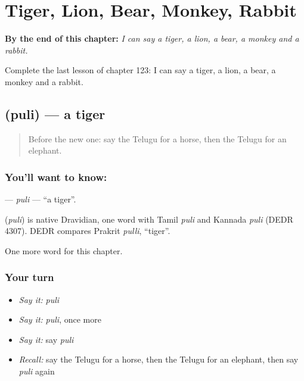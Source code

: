 
\chapter{Tiger, Lion, Bear, Monkey, Rabbit}
\label{ch:te-tiger-lion-bear-monkey-rabbit}

\begin{chapteropening}
\textbf{By the end of this chapter:} \emph{I can say a tiger, a lion, a bear, a monkey and a rabbit.}

Complete the last lesson of chapter 123: I can say a tiger, a lion, a bear, a monkey and a rabbit.
\end{chapteropening}

\section[\texorpdfstring{\te{పులి} (puli)}{పులి (puli)}]{ (puli) — a tiger}

\label{lesson:TE-C123-puli}



\begin{quote}
Before the new one: say the Telugu for a horse, then the Telugu for an elephant.
\end{quote}

\subsection*{You'll want to know: }
\textbf{} — \emph{puli} — \textquotedblleft{}a tiger\textquotedblright{}.

\begin{cousinweb}
\textbf{} (\emph{puli}) is native Dravidian, one word with Tamil \emph{puli} and Kannada \emph{puli} (DEDR 4307). DEDR compares Prakrit \emph{pulli}, \textquotedblleft{}tiger\textquotedblright{}.
\end{cousinweb}

\begin{grammarlens}[title={What you've built}]
One more word for this chapter.
\end{grammarlens}

\subsection*{Your turn}
\begin{itemize}
\raggedright
  \item \emph{Say it:} \emph{puli}
  \item \emph{Say it:} \emph{puli}, once more
  \item \emph{Say it:} say \emph{puli}
  \item \emph{Recall:} say the Telugu for a horse, then the Telugu for an elephant, then say \emph{puli} again
\end{itemize}

